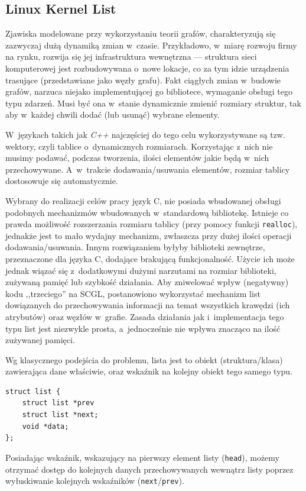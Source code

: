 \documentclass[a4paper,12pt,polish,oneside]{thesis}
\newcommand\code[1]{\lstinline[style=line]{#1}}
\begin{document}
\subsection{Linux Kernel List}

Zjawiska modelowane przy wykorzystaniu teorii grafów, charakteryzują się zazwyczaj dużą dynamiką zmian w~czasie.
Przykładowo, w~miarę rozwoju firmy na rynku, rozwija się jej infrastruktura wewnętrzna --- struktura sieci komputerowej jest rozbudowywana o~nowe lokacje, co za tym idzie urządzenia trasujące (przedstawiane jako węzły grafu).
Fakt ciągłych zmian w~budowie grafów, narzuca niejako implementującej go bibliotece, wymaganie obsługi tego typu zdarzeń.
Musi być ona w~stanie dynamicznie zmienić rozmiary struktur, tak aby w~każdej chwili dodać (lub usunąć) wybrane elementy.

W~językach takich jak \emph{C++} najczęściej do tego celu wykorzystywane są tzw. wektory, czyli tablice o~dynamicznych rozmiarach.
Korzystając z~nich nie musimy podawać, podczas tworzenia, ilości elementów jakie będą w~nich przechowywane.
A~w~trakcie dodawania/usuwania elementów, rozmiar tablicy dostosowuje się automatycznie.

Wybrany do realizacji celów pracy język C, nie posiada wbudowanej obsługi podobnych mechanizmów wbudowanych w~standardową bibliotekę.
Istnieje co prawda możliwość rozszerzania rozmiaru tablicy (przy pomocy funkcji \code{realloc}), jednakże jest to mało wydajny mechanizm, zwłaszcza przy dużej ilości operacji dodawania/usuwania.
Innym rozwiązaniem byłyby biblioteki zewnętrze, przeznaczone dla języka C, dodające brakującą funkcjonalność.
Użycie ich może jednak wiązać się z~dodatkowymi dużymi narzutami na rozmiar biblioteki, zużywaną pamięć lub szybkość działania.
Aby zniwelować wpływ (negatywny) kodu ,,trzeciego'' na SCGL, postanowiono wykorzystać mechanizm list dowiązanych do przechowywania informacji na temat wszystkich krawędzi (ich atrybutów) oraz węzłów w~grafie.
Zasada działania jak i~implementacja tego typu list jest niezwykle prosta, a~jednocześnie nie wpływa znacząco na ilość zużywanej pamięci.

Wg klasycznego podejścia do problemu, lista jest to obiekt (struktura/klasa) zawierająca dane właściwie, oraz wskaźnik na kolejny obiekt tego samego typu.
\begin{lstlisting}[style=code,caption=Idea listy powiązanej w~C]
struct list {
	struct list *prev
	struct list *next;
	void *data;
};
\end{lstlisting}
Posiadając wskaźnik, wskazujący na pierwszy element listy (\code{head}), możemy otrzymać dostęp do kolejnych danych przechowywanych wewnątrz listy poprzez wyłuskiwanie kolejnych wskaźników (\code{next}/\code{prev}).
\end{document}
